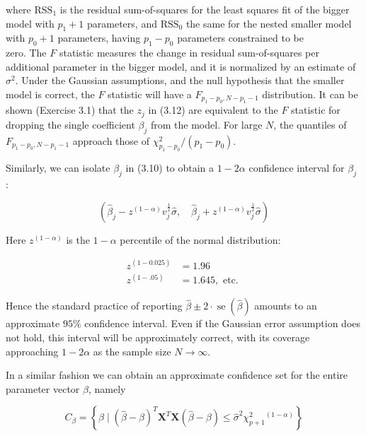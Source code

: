 \documentclass[10pt]{article}
\begin{document}
where $\mathrm{RSS}_{1}$ is the residual sum-of-squares for the least squares fit of the bigger model with $p_{1}+1$ parameters, and $\mathrm{RSS}_{0}$ the same for the nested smaller model with $p_{0}+1$ parameters, having $p_{1}-p_{0}$ parameters constrained to be\\
zero. The $F$ statistic measures the change in residual sum-of-squares per additional parameter in the bigger model, and it is normalized by an estimate of $\sigma^{2}$. Under the Gaussian assumptions, and the null hypothesis that the smaller model is correct, the $F$ statistic will have a $F_{p_{1}-p_{0}, N-p_{1}-1}$ distribution. It can be shown (Exercise 3.1) that the $z_{j}$ in (3.12) are equivalent to the $F$ statistic for dropping the single coefficient $\beta_{j}$ from the model. For large $N$, the quantiles of $F_{p_{1}-p_{0}, N-p_{1}-1}$ approach those of $\chi_{p_{1}-p_{0}}^{2} /\left(p_{1}-p_{0}\right)$.

Similarly, we can isolate $\beta_{j}$ in (3.10) to obtain a $1-2 \alpha$ confidence interval for $\beta_{j}$ :


\begin{equation*}
\left(\hat{\beta}_{j}-z^{(1-\alpha)} v_{j}^{\frac{1}{2}} \hat{\sigma}, \quad \hat{\beta}_{j}+z^{(1-\alpha)} v_{j}^{\frac{1}{2}} \hat{\sigma}\right) \tag{3.14}
\end{equation*}


Here $z^{(1-\alpha)}$ is the $1-\alpha$ percentile of the normal distribution:

$$
\begin{array}{ll}
z^{(1-0.025)} & =1.96 \\
z^{(1-.05)} & =1.645, \text { etc. }
\end{array}
$$

Hence the standard practice of reporting $\hat{\beta} \pm 2 \cdot \operatorname{se}(\hat{\beta})$ amounts to an approximate $95 \%$ confidence interval. Even if the Gaussian error assumption does not hold, this interval will be approximately correct, with its coverage approaching $1-2 \alpha$ as the sample size $N \rightarrow \infty$.

In a similar fashion we can obtain an approximate confidence set for the entire parameter vector $\beta$, namely


\begin{equation*}
C_{\beta}=\left\{\beta \mid(\hat{\beta}-\beta)^{T} \mathbf{X}^{T} \mathbf{X}(\hat{\beta}-\beta) \leq \hat{\sigma}^{2} \chi_{p+1}^{2}{ }^{(1-\alpha)}\right\} \tag{3.15}
\end{equation*}
\end{document}
